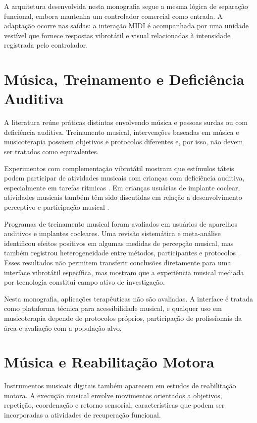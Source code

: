 A arquitetura desenvolvida nesta monografia segue a mesma lógica de separação funcional, embora mantenha um controlador comercial como entrada. A adaptação ocorre nas saídas: a interação MIDI é acompanhada por uma unidade vestível que fornece respostas vibrotátil e visual relacionadas à intensidade registrada pelo controlador.

\section{Música, Treinamento e Deficiência Auditiva}

A literatura reúne práticas distintas envolvendo música e pessoas surdas ou com deficiência auditiva. Treinamento musical, intervenções baseadas em música e musicoterapia possuem objetivos e protocolos diferentes e, por isso, não devem ser tratados como equivalentes.

Experimentos com complementação vibrotátil mostram que estímulos táteis podem participar de atividades musicais com crianças com deficiência auditiva, especialmente em tarefas rítmicas \cite{darrowgoll1989,darrow1992}. Em crianças usuárias de implante coclear, atividades musicais também têm sido discutidas em relação a desenvolvimento perceptivo e participação musical \cite{gfeller2011}.

Programas de treinamento musical foram avaliados em usuários de aparelhos auditivos e implantes cocleares. Uma revisão sistemática e meta-análise identificou efeitos positivos em algumas medidas de percepção musical, mas também registrou heterogeneidade entre métodos, participantes e protocolos \cite{abshukor2021}. Esses resultados não permitem transferir conclusões diretamente para uma interface vibrotátil específica, mas mostram que a experiência musical mediada por tecnologia constitui campo ativo de investigação.

Nesta monografia, aplicações terapêuticas não são avaliadas. A interface é tratada como plataforma técnica para acessibilidade musical, e qualquer uso em musicoterapia depende de protocolos próprios, participação de profissionais da área e avaliação com a população-alvo.

\section{Música e Reabilitação Motora}

Instrumentos musicais digitais também aparecem em estudos de reabilitação motora. A execução musical envolve movimentos orientados a objetivos, repetição, coordenação e retorno sensorial, características que podem ser incorporadas a atividades de recuperação funcional.

